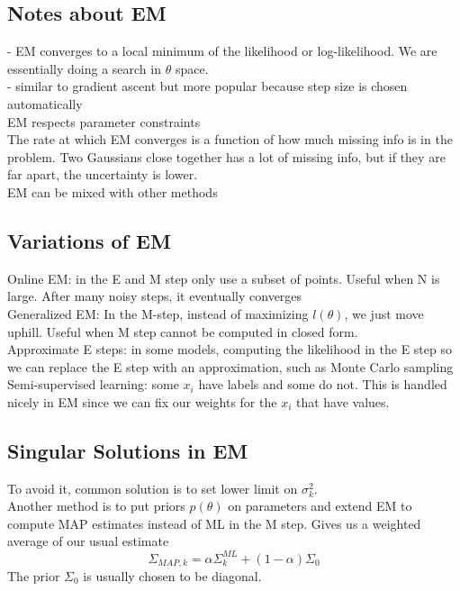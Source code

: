 \documentclass[11pt,psfig]{article}
\begin{document}
\subsection*{Notes about EM}

- EM converges to a local minimum of the likelihood or log-likelihood. We are essentially doing a search in $\theta$ space. 
\\
- similar to gradient ascent but more popular because step size is chosen automatically
\\
EM respects parameter constraints
\\
The rate at which EM converges is a function of how much missing info is in the problem. Two Gaussians close together has a lot of missing info, but if they are far apart, the uncertainty is lower.
\\
EM can be mixed with other methods

\subsection*{Variations of EM}

Online EM: in the E and M step only use a subset of points. Useful when N is large. After many noisy steps, it eventually converges
\\
Generalized EM: In the M-step, instead of maximizing $l(\theta)$, we just move uphill. Useful when M step cannot be computed in closed form. 
\\
Approximate E steps: in some models, computing the likelihood in the E step so we can replace the E step with an approximation, such as Monte Carlo sampling
\\
Semi-supervised learning: some $x_i$ have labels and some do not. This is handled nicely in EM since we can fix our weights for the $x_i$ that have values. 

\subsection*{Singular Solutions in EM}

To avoid it, common solution is to set lower limit on $\sigma_k^2$.\\
Another method is to put priors $p(\theta)$ on parameters and extend EM to compute MAP estimates instead of ML in the M step. Gives us a weighted average of our usual estimate
\[
\Sigma_{MAP,k} = \alpha \Sigma_k^{ML} + (1-\alpha)\Sigma_0
\]
The prior $\Sigma_0$ is usually chosen to be diagonal. 
\end{document}
